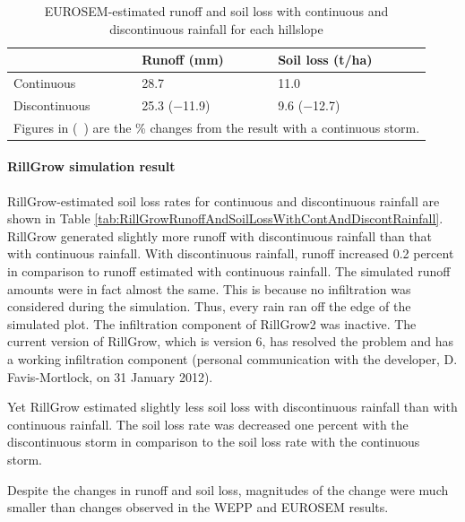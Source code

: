 \begin{table}[hbtp]
  \centering
  \caption{EUROSEM-estimated runoff and soil loss with continuous and
discontinuous rainfall for each hillslope}
  \label{tab:EUROSEMEstimatedSoilLossRatesForEachHillslope}
    \begin{tabular}{lll}
      \toprule
                & Runoff (mm) & Soil loss (t/ha) \\
      \midrule
      Continuous & 28.7 & 11.0 \\
      Discontinuous & 25.3 ($-$11.9)& 9.6 ($-$12.7)\\
      \bottomrule
      \multicolumn{3}{l}{\footnotesize Figures in (\ ) are the \% changes from
the result with a continuous storm.}
    \end{tabular}
\end{table}

\paragraph{RillGrow simulation result} RillGrow-estimated soil loss rates for
continuous and discontinuous rainfall are shown in Table
\ref{tab:RillGrowRunoffAndSoilLossWithContAndDiscontRainfall}. RillGrow
generated slightly more runoff with discontinuous rainfall than that with
continuous rainfall. With discontinuous rainfall, runoff increased 0.2 percent
in comparison to runoff estimated with continuous rainfall. The simulated runoff
amounts were in fact almost the same. This is because no infiltration was
considered during the simulation. Thus, every rain ran off the edge of the
simulated plot. The infiltration component of RillGrow2 was inactive. The
current version of RillGrow, which is version 6, has resolved the problem and
has a working infiltration component (personal communication with the developer,
D. Favis-Mortlock, on 31 January 2012).

Yet RillGrow estimated slightly less soil loss with discontinuous rainfall than
with continuous rainfall. The soil loss rate was decreased one percent with the
discontinuous storm in comparison to the soil loss rate with the continuous
storm.

Despite the changes in runoff and soil loss, magnitudes of the change
were much smaller than changes observed in the WEPP and EUROSEM results.


